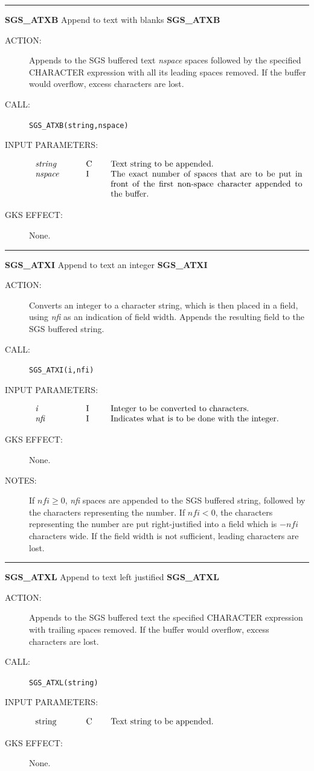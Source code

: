 \documentclass[11pt]{article}
\newcommand{\xlabel}[1]{}
\newcommand{\rthead}[2]{\rule{\textwidth}{0.3mm}
{\Large {\bf #1} \hfill #2 \hfill {\bf #1}}}
\newenvironment{params}%
{\[\begin{tabular}{p{0.14\textwidth}p{0.05\textwidth}p{0.66\textwidth}}}%
{\end{tabular}\]}
\newcommand{\rparams}[3]{{\em #1} &#2 &#3\\}
\newcommand{\rthead}[2]{\subsection{\label{#1}\xlabel{#1}#1 - #2}}
\newenvironment{params}{\begin{description}}{\end{description}}
\newcommand{\rparams}[3]{\item{{\em #1}} (#2) #3}
\begin{document}
\rthead{SGS\_ATXB}{Append to text with blanks}
\begin{description}
\item [ACTION:]
Appends to the SGS buffered text {\em nspace}\/ spaces followed by the specified
CHARACTER expression with all its leading spaces removed.
If the buffer would overflow, excess characters are lost.
\item [CALL:]
{\tt SGS\_ATXB(string,nspace)}
\item [INPUT PARAMETERS:]
\begin{params}
\rparams{string}{C}{Text string to be appended.}
\rparams{nspace}{I}{The exact number of spaces that are to be put in front of the
first non-space character appended to the buffer.}
\end{params}
\item [GKS EFFECT:]
None.
\end{description}
\goodbreak

\rthead{SGS\_ATXI}{Append to text an integer}
\begin{description}
\item [ACTION:]
Converts an integer to a character string, which is then placed in a field,
using {\em nfi}\/ as an indication of field width.
Appends the resulting field to the SGS buffered string.
\item [CALL:]
{\tt SGS\_ATXI(i,nfi)}
\item [INPUT PARAMETERS:]
\begin{params}
\rparams{i}{I}{Integer to be converted to characters.}
\rparams{nfi}{I}{Indicates what is to be done with the integer.}
\end{params}
\item [GKS EFFECT:]
None.
\item [NOTES:]
If $\mathit{nfi}\geq 0$, {\it nfi} spaces are appended to the SGS buffered
string, followed by the characters representing the number.
If $\mathit{nfi}<0$, the characters representing the number are put
right-justified into a field which is $-\mathit{nfi}$ characters wide.
If the field width is not sufficient, leading characters are lost.
\end{description}
\goodbreak

\rthead{SGS\_ATXL}{Append to text left justified}
\begin{description}
\item [ACTION:]
Appends to the SGS buffered text the specified CHARACTER expression with
trailing spaces removed.
If the buffer would overflow, excess characters are lost.
\item [CALL:]
{\tt SGS\_ATXL(string)}
\item [INPUT PARAMETERS:]
\begin{params}
\rparams{\em string}{C}{Text string to be appended.}
\end{params}
\item [GKS EFFECT:]
None.
\end{description}
\goodbreak
\end{document}
